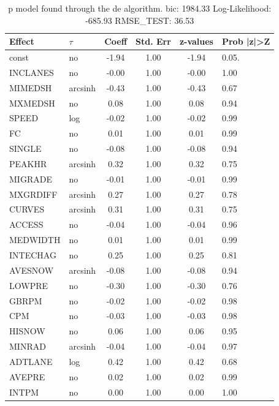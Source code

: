 \begin{table}
	\caption{p model found through the de algorithm. bic: 1984.33 Log-Likelihood: -685.93 RMSE_TEST: 36.53}
	\begin{center}
		\begin{tabular}{|l|l|c|c|c|l|}
			\hline
			Effect & $\tau$ & Coeff & Std. Err & z-values & Prob |z|>Z \\
			\hline
			const & no & -1.94 & 1.00 & -1.94 & 0.05. \\
			\hline
			INCLANES & no & -0.00 & 1.00 & -0.00 & 1.00 \\
			\hline
			MIMEDSH & arcsinh & -0.43 & 1.00 & -0.43 & 0.67 \\
			\hline
			MXMEDSH & no & 0.08 & 1.00 & 0.08 & 0.94 \\
			\hline
			SPEED & log & -0.02 & 1.00 & -0.02 & 0.99 \\
			\hline
			FC & no & 0.01 & 1.00 & 0.01 & 0.99 \\
			\hline
			SINGLE & no & -0.08 & 1.00 & -0.08 & 0.94 \\
			\hline
			PEAKHR & arcsinh & 0.32 & 1.00 & 0.32 & 0.75 \\
			\hline
			MIGRADE & no & -0.01 & 1.00 & -0.01 & 0.99 \\
			\hline
			MXGRDIFF & arcsinh & 0.27 & 1.00 & 0.27 & 0.78 \\
			\hline
			CURVES & arcsinh & 0.31 & 1.00 & 0.31 & 0.75 \\
			\hline
			ACCESS & no & -0.04 & 1.00 & -0.04 & 0.96 \\
			\hline
			MEDWIDTH & no & 0.01 & 1.00 & 0.01 & 0.99 \\
			\hline
			INTECHAG & no & 0.25 & 1.00 & 0.25 & 0.81 \\
			\hline
			AVESNOW & arcsinh & -0.08 & 1.00 & -0.08 & 0.94 \\
			\hline
			LOWPRE & no & -0.30 & 1.00 & -0.30 & 0.76 \\
			\hline
			GBRPM & no & -0.02 & 1.00 & -0.02 & 0.98 \\
			\hline
			CPM & no & -0.03 & 1.00 & -0.03 & 0.98 \\
			\hline
			HISNOW & no & 0.06 & 1.00 & 0.06 & 0.95 \\
			\hline
			MINRAD & arcsinh & -0.04 & 1.00 & -0.04 & 0.97 \\
			\hline
			ADTLANE & log & 0.42 & 1.00 & 0.42 & 0.68 \\
			\hline
			AVEPRE & no & 0.02 & 1.00 & 0.02 & 0.99 \\
			\hline
			INTPM & no & 0.00 & 1.00 & 0.00 & 1.00 \\

\end{tabular}
\end{center}
\end{table}
